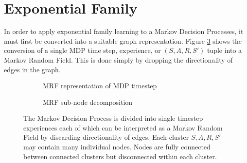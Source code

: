 \documentclass{article} %
\begin{document}
\section{Exponential Family}
In order to apply exponential family learning to a Markov Decision Processes,
it must first be converted into a suitable graph representation. Figure
\ref{fig:structure} shows the conversion of a single MDP time step, experience,
or $(S,A,R,S')$ tuple into a Markov Random Field. This is done simply by
dropping the directionality of edges in the graph.

\begin{figure}
  \centering
  \begin{subfigure}[b]{0.4\textwidth}
    \centering
    \caption{MRF representation of MDP timestep}
    \label{fig:mrf}
  \end{subfigure}
  \begin{subfigure}[b]{0.5\textwidth}
    \centering
    \caption{MRF sub-node decomposition}
    \label{fig:decomp}
  \end{subfigure}
  \caption{The Markov Decision Process is divided into single timestep
  experiences each of which can be interpreted as a Markov Random Field by
  discarding directionality of edges. Each cluster $S,A,R,S'$ may contain many
  individual nodes. Nodes are fully connected between connected clusters but
  disconnected within each cluster.} \label{fig:structure} \end{figure}
\end{document}
